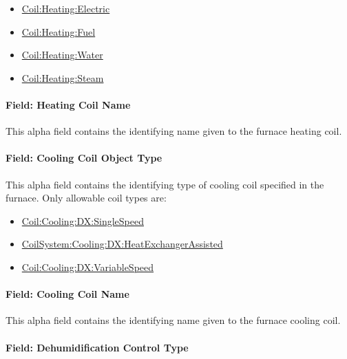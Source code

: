 \begin{itemize}
\item
  \hyperref[coilheatingelectric]{Coil:Heating:Electric}
\item
  \hyperref[coilheatinggas-000]{Coil:Heating:Fuel}
\item
  \hyperref[coilheatingwater]{Coil:Heating:Water}
\item
  \hyperref[coilheatingsteam]{Coil:Heating:Steam}
\end{itemize}

\paragraph{Field: Heating Coil Name}\label{field-heating-coil-name-1-000}

This alpha field contains the identifying name given to the furnace heating coil.

\paragraph{Field: Cooling Coil Object Type}\label{field-cooling-coil-object-type-1-000}

This alpha field contains the identifying type of cooling coil specified in the furnace. Only allowable coil types are:

\begin{itemize}
\item
  \hyperref[coilcoolingdxsinglespeed]{Coil:Cooling:DX:SingleSpeed}
\item
  \hyperref[coilsystemcoolingdxheatexchangerassisted]{CoilSystem:Cooling:DX:HeatExchangerAssisted}
\item
  \hyperref[coilcoolingdxvariablespeed]{Coil:Cooling:DX:VariableSpeed}
\end{itemize}

\paragraph{Field: Cooling Coil Name}\label{field-cooling-coil-name-1-000}

This alpha field contains the identifying name given to the furnace cooling coil.

\paragraph{Field: Dehumidification Control Type}\label{field-dehumidification-control-type-1-000}

